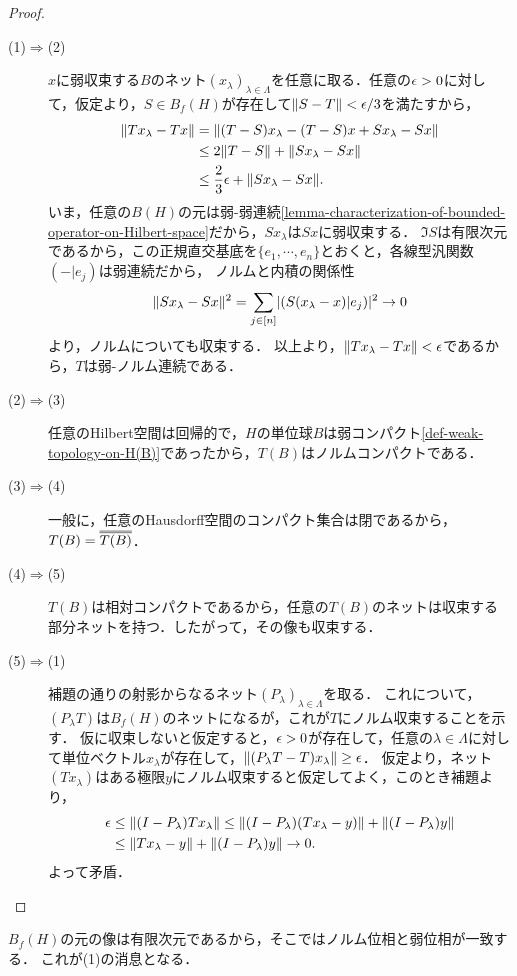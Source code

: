 \documentclass[uplatex,dvipdfmx]{jsreport}
\begin{document}
\begin{proof}\mbox{}
    \begin{description}
        \item[(1)$\Rightarrow$(2)] 
        $x$に弱収束する$B$のネット$(x_\lambda)_{\lambda\in\Lambda}$を任意に取る．任意の$\epsilon>0$に対して，仮定より，$S\in B_f(H)$が存在して$\|S-T\|<\epsilon/3$を満たすから，
        \begin{align*}
            \|Tx_\lambda-Tx\|&=\|(T-S)x_\lambda-(T-S)x+Sx_\lambda-Sx\|\\
            &\le2\|T-S\|+\|Sx_\lambda-Sx\|\\
            &\le\frac{2}{3}\epsilon+\|Sx_\lambda-Sx\|.
        \end{align*}
        いま，任意の$B(H)$の元は弱-弱連続\ref{lemma-characterization-of-bounded-operator-on-Hilbert-space}だから，$Sx_\lambda$は$Sx$に弱収束する．
        $\Im S$は有限次元であるから，この正規直交基底を$\{e_1,\cdots,e_n\}$とおくと，各線型汎関数$(-|e_j)$は弱連続だから，
        ノルムと内積の関係性
        \[\|Sx_\lambda-Sx\|^2=\sum_{j\in[n]}\lvert(S(x_\lambda-x)|e_j)\rvert^2\to0\]
        より，ノルムについても収束する．
        以上より，$\|Tx_\lambda-Tx\|<\epsilon$であるから，$T$は弱-ノルム連続である．
        \item[(2)$\Rightarrow$(3)]
        任意のHilbert空間は回帰的で，$H$の単位球$B$は弱コンパクト\ref{def-weak-topology-on-H(B)}であったから，$T(B)$はノルムコンパクトである．
        \item[(3)$\Rightarrow$(4)]
        一般に，任意のHausdorff空間のコンパクト集合は閉であるから，$T(B)=\oo{T(B)}$．
        \item[(4)$\Rightarrow$(5)]
        $T(B)$は相対コンパクトであるから，任意の$T(B)$のネットは収束する部分ネットを持つ．したがって，その像も収束する．
        \item[(5)$\Rightarrow$(1)]
        補題の通りの射影からなるネット$(P_\lambda)_{\lambda\in\Lambda}$を取る．
        これについて，$(P_\lambda T)$は$B_f(H)$のネットになるが，これが$T$にノルム収束することを示す．
        仮に収束しないと仮定すると，$\epsilon>0$が存在して，任意の$\lambda\in\Lambda$に対して単位ベクトル$x_\lambda$が存在して，$\|(P_\lambda T-T)x_\lambda\|\ge\epsilon$．
        仮定より，ネット$(Tx_\lambda)$はある極限$y$にノルム収束すると仮定してよく，このとき補題より，
        \begin{align*}
            \epsilon&\le\|(I-P_\lambda)Tx_\lambda\|\le\|(I-P_\lambda)(Tx_\lambda-y)\|+\|(I-P_\lambda)y\|\\
            &\le\|Tx_\lambda-y\|+\|(I-P_\lambda)y\|\to0.
        \end{align*}
        よって矛盾．
    \end{description}
\end{proof}
\begin{remarks}
    $B_f(H)$の元の像は有限次元であるから，そこではノルム位相と弱位相が一致する．
    これが(1)の消息となる．
\end{remarks}
\end{document}
